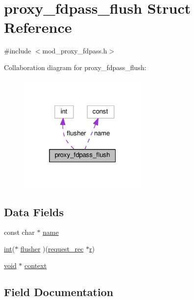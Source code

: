 \hypertarget{structproxy__fdpass__flush}{}\section{proxy\+\_\+fdpass\+\_\+flush Struct Reference}
\label{structproxy__fdpass__flush}


{\ttfamily \#include $<$mod\+\_\+proxy\+\_\+fdpass.\+h$>$}



Collaboration diagram for proxy\+\_\+fdpass\+\_\+flush\+:
\nopagebreak
\begin{figure}[H]
\begin{center}
\leavevmode
\includegraphics[width=181pt]{structproxy__fdpass__flush__coll__graph}
\end{center}
\end{figure}
\subsection*{Data Fields}
\begin{DoxyCompactItemize}
\item 
const char $\ast$ \hyperlink{structproxy__fdpass__flush_ac539ddc1366817d1b5227c6e36d4598a}{name}
\item 
\hyperlink{pcre_8txt_a42dfa4ff673c82d8efe7144098fbc198}{int}($\ast$ \hyperlink{structproxy__fdpass__flush_a2d8d526b17ab8fd21ccee8f6bcdd26ad}{flusher} )(\hyperlink{structrequest__rec}{request\+\_\+rec} $\ast$\hyperlink{pcregrep_8txt_a2e9e9438b26c0bb4425367a7e4f75eb3}{r})
\item 
\hyperlink{group__MOD__ISAPI_gacd6cdbf73df3d9eed42fa493d9b621a6}{void} $\ast$ \hyperlink{structproxy__fdpass__flush_affd6f88674b0fbafb48060e6e0d81370}{context}
\end{DoxyCompactItemize}


\subsection{Field Documentation}
